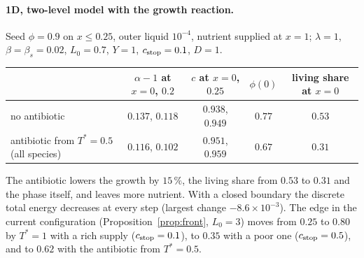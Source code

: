 \documentclass[11pt,a4paper]{article}
\begin{document}
\paragraph{1D, two-level model with the growth reaction.} Seed $\phi=0.9$ on $x\le0.25$,
outer liquid $10^{-4}$, nutrient supplied at $x=1$; $\lambda=1$, $\beta=\beta_s=0.02$,
$L_0=0.7$, $Y=1$, $c_{\rm stop}=0.1$, $D=1$.
\begin{center}\small
\begin{tabular}{@{}lcccc@{}}
\toprule
& $\alpha-1$ at $x=0$, $0.2$ & $c$ at $x=0$, $0.25$ & $\phi(0)$ & living share at $x=0$\\
\midrule
no antibiotic & $0.137$, $0.118$ & $0.938$, $0.949$ & $0.77$ & $0.53$\\
antibiotic from $T^*=0.5$ (all species) & $0.116$, $0.102$ & $0.951$, $0.959$ & $0.67$ & $0.31$\\
\bottomrule
\end{tabular}
\end{center}
The antibiotic lowers the growth by $15\,\%$, the living share from $0.53$ to $0.31$ and the
phase itself, and leaves more nutrient. With a closed boundary the discrete total energy
decreases at every step (largest change $-8.6\times10^{-3}$). The edge in the current
configuration (Proposition~\ref{prop:front}, $L_0=3$) moves from $0.25$ to $0.80$ by $T^*=1$
with a rich supply ($c_{\rm stop}=0.1$), to $0.35$ with a poor one ($c_{\rm stop}=0.5$), and to
$0.62$ with the antibiotic from $T^*=0.5$.
\end{document}
